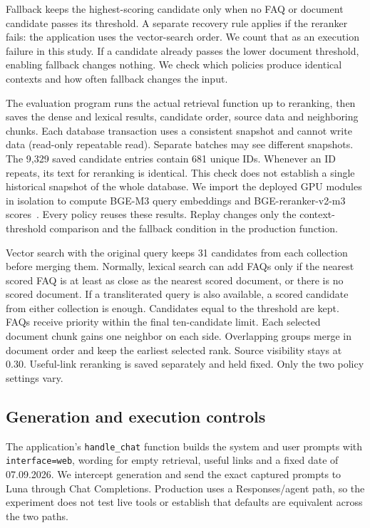 \documentclass[a4paper,10pt,twocolumn]{article}
\begin{document}
Fallback keeps the highest-scoring candidate only when no FAQ or document candidate passes its threshold. A separate recovery rule applies if the reranker fails: the application uses the vector-search order. We count that as an execution failure in this study. If a candidate already passes the lower document threshold, enabling fallback changes nothing. We check which policies produce identical contexts and how often fallback changes the input.

The evaluation program runs the actual retrieval function up to reranking, then saves the dense and lexical results, candidate order, source data and neighboring chunks. Each database transaction uses a consistent snapshot and cannot write data (read-only repeatable read). Separate batches may see different snapshots. The 9,329 saved candidate entries contain 681 unique IDs. Whenever an ID repeats, its text for reranking is identical. This check does not establish a single historical snapshot of the whole database. We import the deployed GPU modules in isolation to compute BGE-M3 query embeddings and BGE-reranker-v2-m3 scores~\cite{chen2024m3,baaiBgeRerankerV2M3}. Every policy reuses these results. Replay changes only the context-threshold comparison and the fallback condition in the production function.

Vector search with the original query keeps 31 candidates from each collection before merging them. Normally, lexical search can add FAQs only if the nearest scored FAQ is at least as close as the nearest scored document, or there is no scored document. If a transliterated query is also available, a scored candidate from either collection is enough. Candidates equal to the threshold are kept. FAQs receive priority within the final ten-candidate limit. Each selected document chunk gains one neighbor on each side. Overlapping groups merge in document order and keep the earliest selected rank. Source visibility stays at 0.30. Useful-link reranking is saved separately and held fixed. Only the two policy settings vary.

\subsection{Generation and execution controls}
The application's \texttt{handle\_chat} function builds the system and user prompts with \texttt{interface=web}, wording for empty retrieval, useful links and a fixed date of 07.09.2026. We intercept generation and send the exact captured prompts to Luna through Chat Completions. Production uses a Responses/agent path, so the experiment does not test live tools or establish that defaults are equivalent across the two paths.
\end{document}
